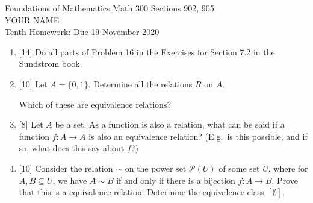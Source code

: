 \documentclass[12pt]{article}
\begin{document}
\LARGE 
\noindent
{\color{Maroon}Foundations of Mathematics \hfill Math 300 Sections 902, 905}\vspace{2pt}\\
\Large YOUR NAME\vspace{2pt}\\
\large
Tenth Homework: \hfill Due 19 November 2020
\normalsize    %

\noindent{\color{blue}\rule{529pt}{2pt}}

  
\begin{enumerate}


\item{[14]} Do all parts of Problem 16  in the Exercises for Section 7.2 in the Sundstrom book. 



\item{[10]}  Let $A=\{0,1\}$.
  Determine all the relations $R$ on $A$.

  Which of these are equivalence relations?

\item{[8]}  Let $A$ be a set.
  As a function is also a relation, what can be said if a function $f\colon A\to A$ is
  also an equivalence relation?
  (E.g.\ is this possible, and if so, what does this say about $f$?)


\item{[10]}  Consider the relation $\sim$ on the power set $\mathcal{P}(U)$ of some set $U$, where
  for $A,B\subseteq U$, we have $A\sim B$ if and only if there is a bijection $f\colon A\to B$.
  Prove that this is a equivalence relation.
  Determine the equivalence class $[\emptyset]$.


\end{enumerate}
\end{document}
